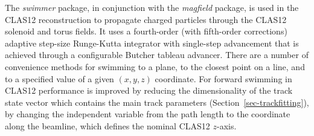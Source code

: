 The {\it swimmer} package, in conjunction with the {\it magfield} package, is used in the CLAS12 reconstruction
to propagate charged particles through the CLAS12 solenoid and torus fields. It uses a fourth-order (with
fifth-order corrections) adaptive step-size Runge-Kutta integrator with single-step advancement that is achieved through
a configurable Butcher tableau advancer. There are a number of convenience methods for swimming to a plane, to
the closest point on a line, and to a specified value of a given $(x,y,z)$ coordinate. 
For forward swimming in CLAS12 performance is improved by reducing
the dimensionality of the track state vector which
contains the main track parameters (Section~\ref{sec-trackfitting}), by
changing the independent variable from the path length 
to the coordinate along the beamline, which defines the
nominal CLAS12 $z$-axis.
